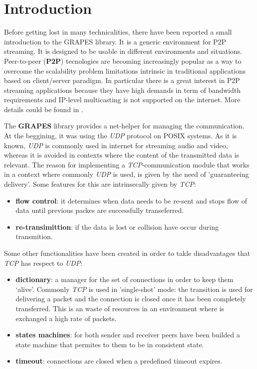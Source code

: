 \section{Introduction}
\label{ch:intro}
Before getting lost in many technicalities, there have been reported a small
introduction to the GRAPES library. It is a generic environment for P2P
streaming. It is designed to be usable in different environments and
situations. Peer-to-peer (\textbf{P2P}) tecnologies are becoming increasingly
popular as a way to overcome the scalability problem limitations intrinsic in
traditional applications based on client/server paradigm. In particular there
is a great interest in P2P streaming applications because they have high
demands in term of bandwidth requirements and IP-level multicasting is not
supported on the internet.
More details could be found in \cite{disi10-038}.

The \textbf{GRAPES} library provides a net-helper for managing the
communication. At the beggining, it was using the \textit{UDP} protocol on POSIX
systems. As it is known, \textit{UDP} is commonly used in internet for streaming audio and video,
whereas it is avoided in contexts where the content of the transmitted data is relevant.
The reason for implementing a \textit{TCP}-communication module that works in a context where
commonly \textit{UDP} is used, is given by the need of 'guaranteeing delivery'.
Some features for this are intrinsecally given by \textit{TCP}:
\begin{itemize}
\item \textbf{flow control}: it determines when data needs to be re-sent and stops flow of data until
  previous packes are successfully transeferred.
\item \textbf{re-transimittion}: if the data is lost or collision have occur during transmition.
\end{itemize}
Some other functionalities have been created in order to takle disadvantages that \textit{TCP} has
respect to \textit{UDP}:
\begin{itemize}
\item \textbf{dictionary}: a manager for the set of connections in order to keep them `alive'.
                          Commonly \textit{TCP} is used in 'single-shot' mode: the transition is
                          used for delivering a packet and the connection is closed once it has
                          been completely transferred. This is an waste of resources in an
                          environment where is exchanged a high rate of packets.
\item \textbf{states machines}: for both sender and receiver peers have been builded a state machine
                                that permites to them to be in consistent state.
\item \textbf{timeout}: connections are closed when a predefined timeout expires.
\end{itemize}

